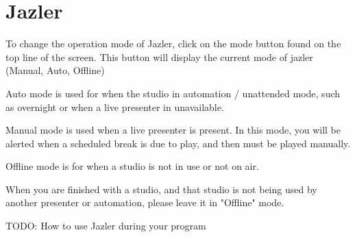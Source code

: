 \documentclass[../StudioOperationGuide.tex]{subfiles}
\begin{document}
\chapter{Jazler}




To change the operation mode of Jazler, click on the mode button found
on the top line of the screen. This button will display the current mode
of jazler (Manual, Auto, Offline)

Auto mode is used for when the studio in automation / unattended mode, such
as overnight or when a live presenter in unavailable.


Manual mode is used when a live presenter is present. In this mode, you will be
alerted when a scheduled break is due to play, and then must be played
manually.


Offline mode is for when a studio is not in use or not on air.


When you are finished with a studio, and that studio is not being used
by another presenter or automation, please leave it in "Offline" mode.


TODO: How to use Jazler during your program
\end{document}
